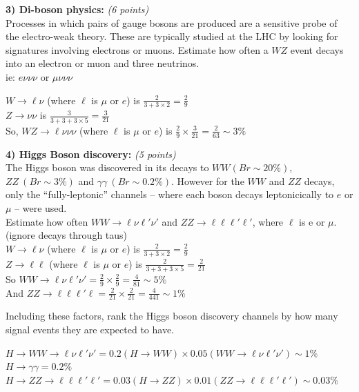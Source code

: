 {\vspace{0.5in}

\textbf{3) Di-boson physics:  } \hfill \textit{(6 points)}\\
Processes in which pairs of gauge bosons are produced are a sensitive probe of the electro-weak theory. These are typically studied at the LHC by looking for signatures involving electrons or muons.  
Estimate how often a $WZ$ event decays into an electron or muon and three neutrinos.\\ ie: $e\nu\nu\nu$ or $\mu\nu\nu\nu$

\bc
$W \rightarrow \ell\nu$ (where $\ell$ is $\mu$ or $e$) is $\frac{2}{3+3\times 2} = \frac{2}{9}$ \\
$Z \rightarrow \nu\nu$  is $\frac{3}{3+3+3\times 5} = \frac{3}{21}$ \\
So, $WZ \rightarrow \ell\nu\nu\nu$ (where $\ell$ is $\mu$ or $e$) is $\frac{2}{9} \times \frac{3}{21} = \frac{2}{63} \sim 3\%$
\ec

\vspace{0.5in}

\textbf{4) Higgs Boson discovery: } \hfill \textit{(5 points)}\\
The Higgs boson was discovered in its decays to $WW (Br\sim20\%)$, $ZZ\ (Br\sim3\%)$ and $\gamma\gamma\ (Br\sim0.2\%)$.
However for the $WW$ and $ZZ$ decays, only the ``fully-leptonic'' channels -- where each boson decays leptonicically to $e$ or $\mu$ -- were used. \\

Estimate how often $WW \rightarrow \ell\nu\ell'\nu'$ and $ZZ\rightarrow\ell\ell\ell'\ell'$, where $\ell$ is e or $\mu$. (ignore decays through taus)\\

\bc
$W \rightarrow \ell\nu$ (where $\ell$ is $\mu$ or $e$) is $\frac{2}{3+3\times 2} = \frac{2}{9}$ \\
$Z \rightarrow \ell\ell$  (where $\ell$ is $\mu$ or $e$) is $\frac{2}{3+3+3\times 5} = \frac{2}{21}$ \\
So $WW\rightarrow \ell\nu\ell'\nu' = \frac{2}{9}\times\frac{2}{9} = \frac{4}{81} \sim 5\%$ \\
And $ZZ\rightarrow \ell\ell\ell'\ell = \frac{2}{21}\times\frac{2}{21} = \frac{4}{441} \sim 1\%$
\ec

Including these factors, rank the Higgs boson discovery channels by how many signal events they are expected to have.

\bc
$H\rightarrow WW \rightarrow \ell\nu\ell'\nu' = 0.2(H\rightarrow WW) \times 0.05 (WW\rightarrow\ell\nu\ell'\nu') \sim 1\%$\\
$H\rightarrow \gamma\gamma = 0.2\% $\\
$H\rightarrow ZZ\rightarrow\ell\ell\ell'\ell' = 0.03 (H\rightarrow ZZ) \times 0.01 (ZZ\rightarrow\ell\ell\ell'\ell') \sim 0.03\%  $
\ec

}
